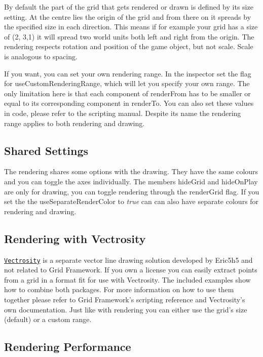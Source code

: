 By default the part of the grid that gets rendered or drawn is defined by its {\ttfamily size} setting. At the centre lies the origin of the grid and from there on it spreads by the specified size in each direction. This means if for example your grid has a {\ttfamily size} of (2, 3,1) it will spread two world units both left and right from the origin. The rendering respects rotation and position of the game object, but not scale. Scale is analogous to spacing.

If you want, you can set your own rendering range. In the inspector set the flag for {\ttfamily use\+Custom\+Rendering\+Range}, which will let you specify your own range. The only limitation here is that each component of {\ttfamily render\+From} has to be smaller or equal to its corresponding component in {\ttfamily render\+To}. You can also set these values in code, please refer to the scripting manual. Despite its name the rendering range applies to both rendering and drawing.

\subsection*{Shared Settings }

The rendering shares some options with the drawing. They have the same colours and you can toggle the axes individually. The members {\ttfamily hide\+Grid} and {\ttfamily hide\+On\+Play} are only for drawing, you can toggle rendering through the {\ttfamily render\+Grid} flag. If you set the the {\ttfamily use\+Separate\+Render\+Color} to {\itshape true} can can also have separate colours for rendering and drawing.

\subsection*{Rendering with Vectrosity }

\href{http://starscenesoftware.com/vectrosity.html}{\tt Vectrosity} is a separate vector line drawing solution developed by Eric5h5 and not related to Grid Framework. If you own a license you can easily extract points from a grid in a format fit for use with Vectrosity. The included examples show how to combine both packages. For more information on how to use them together please refer to Grid Framework’s scripting reference and Vectrosity’s own documentation. Just like with rendering you can either use the grid’s {\ttfamily size} (default) or a custom range.

 \subsection*{Rendering Performance }

